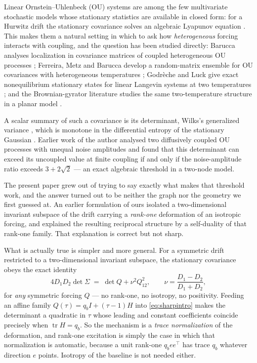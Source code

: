 \documentclass[11pt]{article}
\theoremstyle{plain}
\theoremstyle{definition}
\theoremstyle{remark}
\newcommand{\tr}{\operatorname{tr}}
\newcommand{\Sig}{\Sigma}
\newcommand{\T}{^{\!\top}}
\begin{document}
Linear Ornstein--Uhlenbeck (OU) systems are among the few multivariate stochastic models whose
stationary statistics are available in closed form: for a Hurwitz drift the stationary
covariance solves an algebraic Lyapunov equation
\cite{UhlenbeckOrnstein1930,Gardiner2004,Vatiwutipong2019}. This makes them a natural setting in
which to ask how \emph{heterogeneous} forcing interacts with coupling, and the question has been
studied directly: Barucca analyses localization in covariance matrices of coupled heterogeneous
OU processes \cite{Barucca2014}; Ferreira, Metz and Barucca develop a random-matrix ensemble for
OU covariances with heterogeneous temperatures \cite{FerreiraMetzBarucca2025}; Godr\`eche and
Luck give exact nonequilibrium stationary states for linear Langevin systems at two temperatures
\cite{GodrecheLuck2019}; and the Brownian-gyrator literature studies the same two-temperature
structure in a planar model \cite{FilligerReimann2007,DotsenkoEtAl2013}.

A scalar summary of such a covariance is its determinant, Wilks's generalized variance
\cite{Wilks1932}, which is monotone in the differential entropy of the stationary Gaussian
\cite{CoverThomas2005}. Earlier work of the author \cite{DeJesus2026ou} analysed two diffusively
coupled OU processes with unequal noise amplitudes and found that this determinant can exceed
its uncoupled value at finite coupling if and only if the noise-amplitude ratio exceeds
$3+2\sqrt2$ --- an exact algebraic threshold in a two-node model.

The present paper grew out of trying to say exactly what makes that threshold work, and the
answer turned out to be neither the graph nor the geometry we first guessed at. An earlier
formulation of ours isolated a two-dimensional invariant subspace of the drift carrying a
\emph{rank-one} deformation of an isotropic forcing, and explained the resulting reciprocal
structure by a self-duality of that rank-one family. That explanation is correct but not sharp.

What is actually true is simpler and more general. For a symmetric drift restricted to a
two-dimensional invariant subspace, the stationary covariance obeys the exact identity
\begin{equation}
  4D_1D_2\det\Sig \;=\; \det Q + \nu^2Q_{12}^2,
  \qquad \nu=\frac{D_1-D_2}{D_1+D_2}, \label{eq:sharpintro}
\end{equation}
for \emph{any} symmetric forcing $Q$ --- no rank-one, no isotropy, no positivity. Feeding an
affine family $Q(\tau)=q_bI+(\tau-1)H$ into \eqref{eq:sharpintro} makes the determinant a
quadratic in $\tau$ whose leading and constant coefficients coincide precisely when
$\tr H=q_b$. So the mechanism is a \emph{trace normalization} of the deformation, and rank-one
excitation is simply the case in which that normalization is automatic, because a unit rank-one
$q_bee\T$ has trace $q_b$ whatever direction $e$ points. Isotropy of the baseline is not needed
either.
\end{document}
